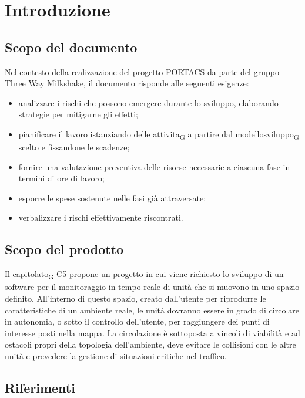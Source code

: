 \section{Introduzione}




\subsection{Scopo del documento}

Nel contesto della realizzazione del progetto PORTACS da parte del gruppo Three Way Milkshake, il documento risponde alle seguenti esigenze: 
\begin{itemize}
	\item analizzare i rischi che possono emergere durante lo sviluppo, elaborando strategie per mitigarne gli effetti;
	\item pianificare il lavoro istanziando delle \gls{attivita}\textsubscript{G} a partire dal \gls{modellosviluppo}\textsubscript{G} scelto e fissandone le scadenze;
	\item fornire una valutazione preventiva delle risorse necessarie a ciascuna fase in termini di ore di lavoro;
	\item esporre le spese sostenute nelle fasi già attraversate;
	\item verbalizzare i rischi effettivamente riscontrati.
\end{itemize}



\subsection{Scopo del prodotto}

Il \gls{capitolato}\textsubscript{G} C5 propone un progetto in cui viene richiesto lo sviluppo di un software per il monitoraggio in tempo reale di unità che si muovono in uno spazio definito. All’interno di questo spazio, creato dall’utente per riprodurre le caratteristiche di un ambiente reale, le unità dovranno essere in grado di circolare in autonomia, o sotto il controllo dell’utente, per raggiungere dei punti di interesse posti nella mappa.  La circolazione è sottoposta a vincoli di viabilità e ad ostacoli propri della topologia dell’ambiente, deve evitare le collisioni con le altre unità e prevedere la gestione di situazioni critiche nel traffico.




\subsection{Riferimenti}



